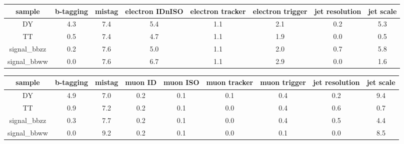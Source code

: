 \begin{sidewaystable}
\begin{center}
\caption{Yield variations, ee channel, 300 GeV.}
\begin{tabular}{ | c | c | c | c | c | c |c | c | } \hline
 sample & b-tagging &  mistag &  electron IDnISO &  electron tracker &  electron trigger &  jet resolution &  jet scale \\\hline
  DY &              4.3 &     7.4 &              5.4 &               1.1 &               2.1 &             0.2 &        5.3 \\
  TT &              0.5 &     7.4 &              4.7 &               1.1 &               1.9 &             0.0 &        0.5 \\
  signal\_bbzz &    0.2 &     7.6 &              5.0 &               1.1 &               2.0 &             0.7 &        5.8 \\
  signal\_bbww &    0.0 &     7.6 &              6.7 &               1.1 &               2.9 &             0.0 &        1.6 \\\hline
\end{tabular}
\label{normalization_electron}
\end{center}
\begin{center}
\caption{Yield variations, mm channel, 300 GeV.}
\begin{tabular}{ | c | c | c | c| c | c | c | c| c |}\hline
sample &  b-tagging &  mistag &  muon ID &  muon ISO &  muon tracker &  muon trigger &  jet resolution &  jet scale \\\hline
  DY &              4.9 &     7.0 &      0.2 &       0.1 &           0.1 &           0.4 &             0.2 &        9.4 \\
  TT &              0.9 &     7.2 &      0.2 &       0.1 &           0.0 &           0.4 &             0.6 &        0.7 \\
  signal\_bbzz &    0.3 &     7.7 &      0.2 &       0.1 &           0.0 &           0.4 &             0.5 &        4.4 \\
  signal\_bbww &    0.0 &     9.2 &      0.2 &       0.1 &           0.0 &           0.1 &             0.0 &        8.5 \\\hline
\end{tabular}
\label{yieldVariations}
\end{center}
\end{sidewaystable}
